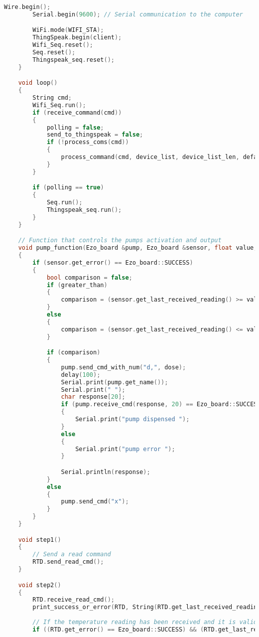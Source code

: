 \begin{lstlisting}[language=C++]
        Wire.begin();       
        Serial.begin(9600); // Serial communication to the computer

        WiFi.mode(WIFI_STA);         
        ThingSpeak.begin(client); 
        Wifi_Seq.reset();         
        Seq.reset();
        Thingspeak_seq.reset();
    }

    void loop() 
    {
        String cmd;
        Wifi_Seq.run();
        if (receive_command(cmd)) 
        {
            polling = false;
            send_to_thingspeak = false;
            if (!process_coms(cmd)) 
            {
                process_command(cmd, device_list, device_list_len, default_board);
            }
        }

        if (polling == true) 
        {
            Seq.run();
            Thingspeak_seq.run();
        }
    }

    // Function that controls the pumps activation and output
    void pump_function(Ezo_board &pump, Ezo_board &sensor, float value, float dose, bool greater_than) 
    {
        if (sensor.get_error() == Ezo_board::SUCCESS) 
        {
            bool comparison = false;
            if (greater_than) 
            {
                comparison = (sensor.get_last_received_reading() >= value);
            } 
            else 
            {
                comparison = (sensor.get_last_received_reading() <= value);
            }

            if (comparison) 
            {
                pump.send_cmd_with_num("d,", dose);
                delay(100);
                Serial.print(pump.get_name());
                Serial.print(" ");
                char response[20];
                if (pump.receive_cmd(response, 20) == Ezo_board::SUCCESS) 
                {
                    Serial.print("pump dispensed ");
                } 
                else 
                {
                    Serial.print("pump error ");
                }

                Serial.println(response);
            } 
            else 
            {
                pump.send_cmd("x");
            }
        }
    }

    void step1() 
    {
        // Send a read command
        RTD.send_read_cmd();
    }

    void step2() 
    {
        RTD.receive_read_cmd();
        print_success_or_error(RTD, String(RTD.get_last_received_reading(), 2).c_str());
        
        // If the temperature reading has been received and it is valid
        if ((RTD.get_error() == Ezo_board::SUCCESS) && (RTD.get_last_received_reading() > -1000.0)) 
        

\end{lstlisting}

